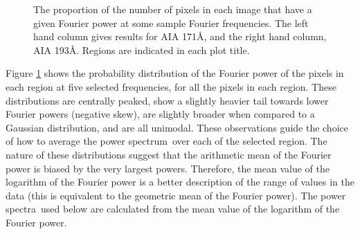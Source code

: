 \documentclass[onecolumn]{emulateapj}
\newcommand{\PS}{power spectrum}
\newcommand{\PA}{power spectra}
\newcommand{\BF}{ }
\begin{document}
\begin{figure}
\centerline{
}
\centerline{
}
\centerline{
}
\centerline{
}
\caption{{\BF The proportion of the number of pixels in each image
    that have a given Fourier power at some sample Fourier
    frequencies.  The left hand column gives results for AIA 171\AA,
    and the right hand column, AIA 193\AA.  Regions are indicated in
    each plot title.}}
\label{fig:dist171193}
\end{figure}
Figure \ref{fig:dist171193} shows the probability distribution of the
Fourier power of the pixels in each region at five selected
frequencies, for all the pixels in each region.  These distributions
are centrally peaked, show a slightly heavier tail towards lower
Fourier powers (negative skew), are slightly broader when compared to
a Gaussian distribution, and are all unimodal.  These observations
guide the choice of how to average the \PS\ over each of the selected
region.  The nature of these distributions suggest that the arithmetic
mean of the Fourier power is biased by the very largest powers.
Therefore, the mean value of the logarithm of the Fourier power is a
better description of the range of values in the data (this is
equivalent to the geometric mean of the Fourier power).  The \PA\ used
below are calculated from the mean value of the logarithm of the
Fourier power.
\end{document}
